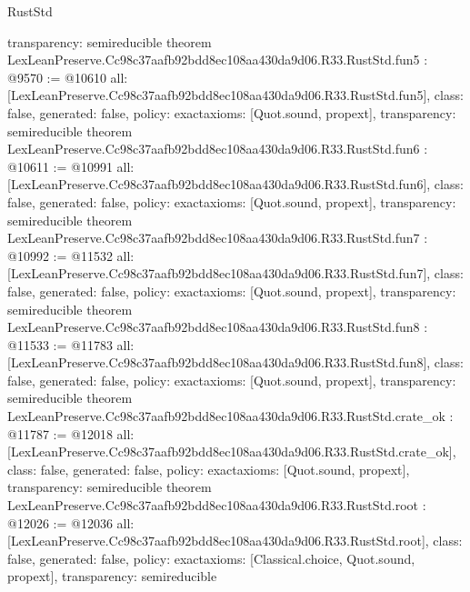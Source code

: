 \begin{lexlean}{RustStd}
\begin{coremodule}
{  transparency: semireducible
}
theorem LexLeanPreserve.Cc98c37aafb92bdd8ec108aa430da9d06.R33.RustStd.fun5 : @9570 := @10610 {
  all: [LexLeanPreserve.Cc98c37aafb92bdd8ec108aa430da9d06.R33.RustStd.fun5],
  class: false,
  generated: false,
  policy: exact{axioms: [Quot.sound, propext]},
  transparency: semireducible
}
theorem LexLeanPreserve.Cc98c37aafb92bdd8ec108aa430da9d06.R33.RustStd.fun6 : @10611 := @10991 {
  all: [LexLeanPreserve.Cc98c37aafb92bdd8ec108aa430da9d06.R33.RustStd.fun6],
  class: false,
  generated: false,
  policy: exact{axioms: [Quot.sound, propext]},
  transparency: semireducible
}
theorem LexLeanPreserve.Cc98c37aafb92bdd8ec108aa430da9d06.R33.RustStd.fun7 : @10992 := @11532 {
  all: [LexLeanPreserve.Cc98c37aafb92bdd8ec108aa430da9d06.R33.RustStd.fun7],
  class: false,
  generated: false,
  policy: exact{axioms: [Quot.sound, propext]},
  transparency: semireducible
}
theorem LexLeanPreserve.Cc98c37aafb92bdd8ec108aa430da9d06.R33.RustStd.fun8 : @11533 := @11783 {
  all: [LexLeanPreserve.Cc98c37aafb92bdd8ec108aa430da9d06.R33.RustStd.fun8],
  class: false,
  generated: false,
  policy: exact{axioms: [Quot.sound, propext]},
  transparency: semireducible
}
theorem LexLeanPreserve.Cc98c37aafb92bdd8ec108aa430da9d06.R33.RustStd.crate_ok : @11787 := @12018 {
  all: [LexLeanPreserve.Cc98c37aafb92bdd8ec108aa430da9d06.R33.RustStd.crate_ok],
  class: false,
  generated: false,
  policy: exact{axioms: [Quot.sound, propext]},
  transparency: semireducible
}
theorem LexLeanPreserve.Cc98c37aafb92bdd8ec108aa430da9d06.R33.RustStd.root : @12026 := @12036 {
  all: [LexLeanPreserve.Cc98c37aafb92bdd8ec108aa430da9d06.R33.RustStd.root],
  class: false,
  generated: false,
  policy: exact{axioms: [Classical.choice, Quot.sound, propext]},
  transparency: semireducible
}


\end{coremodule}
\end{lexlean}
